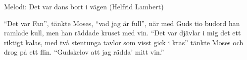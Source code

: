 \begin{song}

\begin{songmeta}
Melodi: Det var dans bort i vägen (Helfrid Lambert)
\end{songmeta}

\begin{songtext}
\textquotedblleft{}Det var Fan\textquotedblright{}, tänkte Moses, \textquotedblleft{}vad jag är full\textquotedblright{},
när med Guds tio budord han ramlade kull,
men han räddade kruset med vin.
\textquotedblleft{}Det var djävlar i mig det ett riktigt kalas,
med två stentunga tavlor som visst gick i kras\textquotedblright{}
tänkte Moses och drog på ett flin.
\textquotedblleft{}Gudskelov att jag rädda' mitt vin.\textquotedblright{}
\end{songtext}
\end{song}
